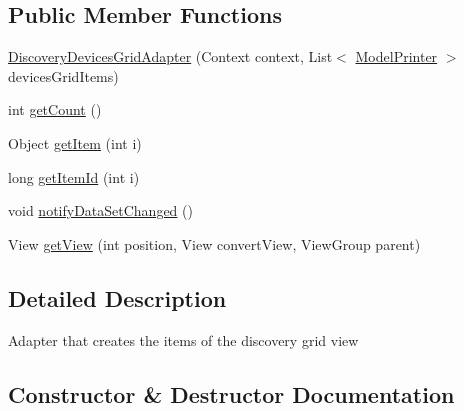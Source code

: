 \subsection*{Public Member Functions}
\begin{DoxyCompactItemize}
\item 
\hyperlink{classandroid_1_1app_1_1printerapp_1_1devices_1_1discovery_1_1_discovery_devices_grid_adapter_a1e66942363b35ec1ad70146265ab228d}{Discovery\+Devices\+Grid\+Adapter} (Context context, List$<$ \hyperlink{classandroid_1_1app_1_1printerapp_1_1model_1_1_model_printer}{Model\+Printer} $>$ devices\+Grid\+Items)
\item 
int \hyperlink{classandroid_1_1app_1_1printerapp_1_1devices_1_1discovery_1_1_discovery_devices_grid_adapter_a968d62f4f13239734aca02cb75ccd8f7}{get\+Count} ()
\item 
Object \hyperlink{classandroid_1_1app_1_1printerapp_1_1devices_1_1discovery_1_1_discovery_devices_grid_adapter_a634570fbc4a5426574ce3b69463dce54}{get\+Item} (int i)
\item 
long \hyperlink{classandroid_1_1app_1_1printerapp_1_1devices_1_1discovery_1_1_discovery_devices_grid_adapter_ae89ff0eee44901b06737fd387626f06d}{get\+Item\+Id} (int i)
\item 
void \hyperlink{classandroid_1_1app_1_1printerapp_1_1devices_1_1discovery_1_1_discovery_devices_grid_adapter_abf9c74012ce1a2e44247dbc18768b10e}{notify\+Data\+Set\+Changed} ()
\item 
View \hyperlink{classandroid_1_1app_1_1printerapp_1_1devices_1_1discovery_1_1_discovery_devices_grid_adapter_ae32a752ce1267f6253c38eeefcdb9f5c}{get\+View} (int position, View convert\+View, View\+Group parent)
\end{DoxyCompactItemize}


\subsection{Detailed Description}
Adapter that creates the items of the discovery grid view 

\subsection{Constructor \& Destructor Documentation}
\mbox{\label{classandroid_1_1app_1_1printerapp_1_1devices_1_1discovery_1_1_discovery_devices_grid_adapter_a1e66942363b35ec1ad70146265ab228d}} 
